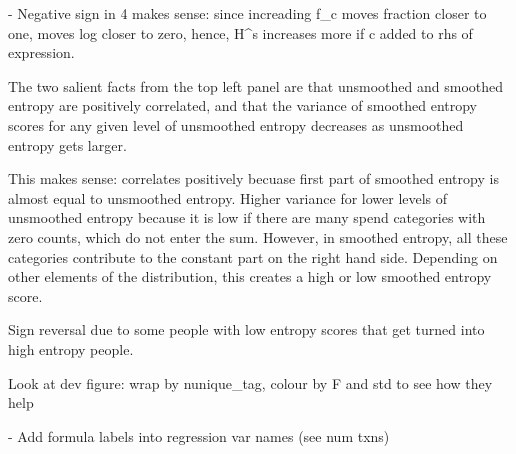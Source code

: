\newpage


- Negative sign in 4 makes sense: since increading f_c moves fraction closer to
one, moves log closer to zero, hence, H^s increases more if c added to rhs of
expression.

The two salient facts from the top left panel are that unsmoothed and smoothed
entropy are positively correlated, and that the variance of smoothed entropy
scores for any given level of unsmoothed entropy decreases as unsmoothed
entropy gets larger.

This makes sense: correlates positively becuase first part of smoothed entropy
is almost equal to unsmoothed entropy. Higher variance for lower levels of
unsmoothed entropy because it is low if there are many spend categories with zero
counts, which do not enter the sum. However, in smoothed entropy, all these
categories contribute to the constant part on the right hand side. Depending on
other elements of the distribution, this creates a high or low smoothed entropy
score.

Sign reversal due to some people with low entropy scores that get turned into
high entropy people.

Look at dev figure: wrap by nunique_tag, colour by F and std to see how they
help

- Add formula labels into regression var names (see num txns)
